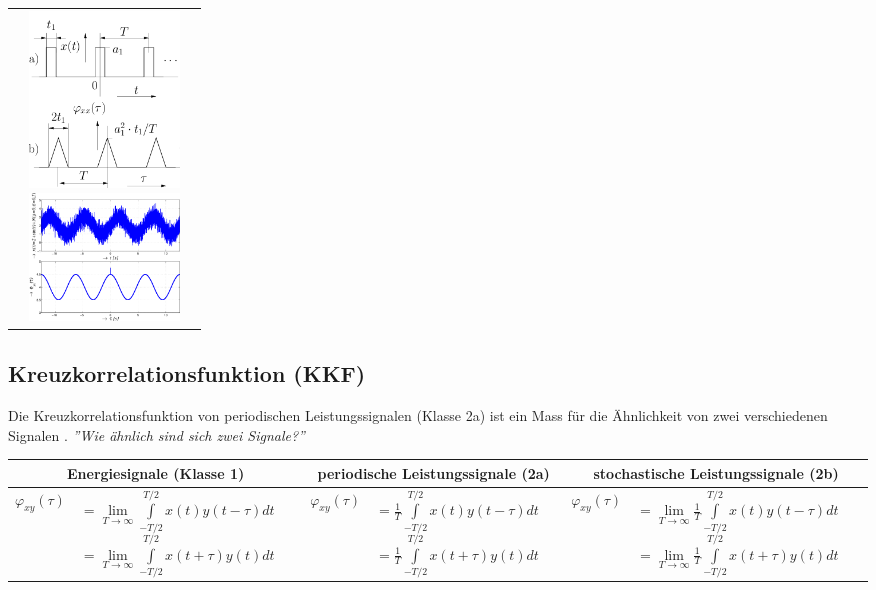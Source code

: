 \begin{tabularx}{\textwidth}{lXX}
{   		}
   		&
   		\parbox{5cm}{
   			\includegraphics[width=4cm]{./bilder/akf1.png}\\
   			\includegraphics[width=4cm]{./bilder/akf2.png}
   		}
	   	\\
		\end{tabularx}
				
	\subsection{Kreuzkorrelationsfunktion (KKF) } 
		Die Kreuzkorrelationsfunktion von periodischen Leistungssignalen (Klasse 2a) ist ein Mass für die Ähnlichkeit von zwei verschiedenen Signalen . \textit{''Wie ähnlich sind sich zwei Signale?'' \ }
		\\	
		\bgroup
		\setlength{\tabcolsep}{2mm}
		\begin{tabularx}{\textwidth}{|cX|cX|cX|}
		\hline 
			\multicolumn{2}{|c|}{\textbf{Energiesignale} (Klasse 1)} &
			\multicolumn{2}{|c|}{\textbf{periodische Leistungssignale} (2a)} & 
			\multicolumn{2}{|c|}{\textbf{stochastische Leistungssignale} (2b)}
		\\ \hline 
			$ \varphi_{xy}(\tau) $ &
			$ 		= \lim\limits_{T\to\infty}\int\limits_{-T/2}^{T/2} x(t)y(t-\tau)dt $ \linebreak
			$	 	= \lim\limits_{T\to\infty}\int\limits_{-T/2}^{T/2} x(t+\tau)y(t)dt $ &
			$ \varphi_{xy}(\tau) $ &
			$ 		= \frac{1}{T}\int\limits_{-T/2}^{T/2} x(t)y(t-\tau)dt $ \linebreak
			$		= \frac{1}{T}\int\limits_{-T/2}^{T/2} x(t+\tau)y(t)dt $ &
			$ \varphi_{xy}(\tau) $ &
			$		= \lim\limits_{T\rightarrow\infty}\frac{1}{T} \int\limits_{-T/2}^{T/2} x(t)y(t-\tau)dt $ \linebreak
			$		= \lim\limits_{T\rightarrow\infty}\frac{1}{T} \int\limits_{-T/2}^{T/2} x(t+\tau)y(t)dt $
		\\ \hline
		\end{tabularx} 
		\egroup

